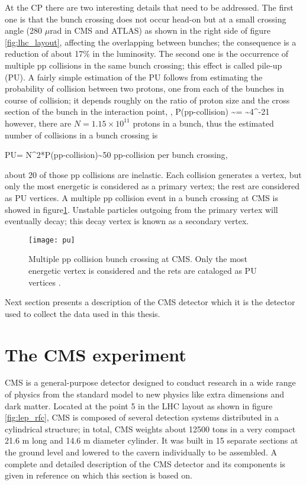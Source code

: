 \noindent At the CP there are two interesting details that need to be addressed. The first one is that the bunch crossing does not occur head-on but at a small crossing angle (280 $\mu$rad in CMS and ATLAS) as shown in the right side of figure \ref{fig:lhc_layout}, affecting the overlapping between bunches; the consequence is a reduction of about 17\% in the luminosity. The second one is the occurrence of multiple pp collisions in the same bunch crossing; this effect is called pile-up (PU). A fairly simple estimation of the PU follows from estimating the probability of collision between two protons, one from each of the bunches in course of collision; it depends roughly on the ratio of proton size and the cross section of the bunch in the interaction point, \ie,
\beqn
P(pp-collision) \sim {}= \sim 4^{-21}
\eeqn
\noindent however, there are $N=1.15\times 10^{11}$ protons in a bunch, thus the estimated number of collisions in a bunch crossing is

\beqn
PU= N^2*P(pp-collision)\sim 50  \textrm{  pp-collision per bunch crossing},
\eeqn

\noindent about 20 of those pp collisions are inelastic. Each collision generates a vertex, but only the most energetic is considered as a primary vertex; the rest are considered as PU vertices.  A multiple pp collision event in a bunch crossing at CMS is showed in figure\ref{fig:pu}. Unstable particles outgoing from the primary vertex will eventually decay; this decay vertex is known as a secondary vertex.      

\begin{figure}[!h]
\centering
\texttt{[image: pu]}
\caption [Multiple pp collision bunch crossing at CMS.]{Multiple pp collision bunch crossing at CMS. Only the most energetic vertex is considered and the rets are cataloged as PU vertices \cite{pu}. }\label{fig:pu}
\end{figure}

\noindent Next section presents a description of the CMS detector which it is the detector used to collect the data used in this thesis.


\section{The CMS experiment}

\noindent CMS is a general-purpose detector designed to conduct research in a wide range of physics from the standard model to new physics like extra dimensions and dark matter. Located at the point 5 in the LHC layout as shown in figure \ref{fig:lep_rfc}, CMS is composed of several detection systems distributed in a cylindrical structure; in total, CMS weights about 12500 tons in a very compact 21.6 m long and 14.6 m diameter cylinder. It was built in 15 separate sections at the ground level and lowered to the cavern individually to be assembled. A complete and detailed description of the CMS detector and its components is given in reference \cite{cms} on which this section is based on.\\

